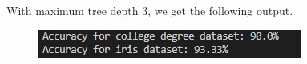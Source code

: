 \begin{answer}
With maximum tree depth 3, we get the following output.
\begin{figure}[H]
    \centering
    \includegraphics{decision_trees_general/tree_acc.jpg}
\end{figure}
\end{answer}
